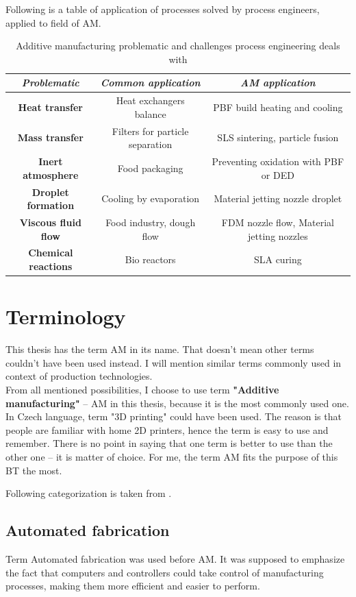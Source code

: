 \documentclass[a4paper, 11pt, reqno]{report}
\begin{document}
	Following is a table of application of processes solved by process engineers, applied to field of AM.
\\[10pt]
\begin{table}[b]
\begin{tabular}{||c||c||c|}
\hline 
\textit{Problematic} & \textit{Common application} & \textit{AM application} \\ 
\hline 
\textbf{Heat transfer} & Heat exchangers balance & PBF build heating and cooling \\
\hline
\textbf{Mass transfer} & Filters for particle separation & SLS sintering, particle fusion \\ 
\hline 
\textbf{Inert atmosphere} & Food packaging & Preventing oxidation with PBF or DED\\
\hline 
\textbf{Droplet formation} & Cooling by evaporation & Material jetting nozzle droplet \\ 
\hline 
\textbf{Viscous fluid flow} & Food industry, dough flow & FDM nozzle flow, Material jetting nozzles\\ 
\hline 
\textbf{Chemical reactions} & Bio reactors & SLA curing\\ 
\hline 
\end{tabular}
\caption{Additive manufacturing problematic and challenges process engineering deals with}
\end{table}
%
\section{Terminology}
This thesis has the term AM in its name. That doesn't mean other terms couldn't have been used instead. I will mention similar terms commonly used in context of production technologies.\\
From all mentioned possibilities, I choose to use term \textbf{"Additive manufacturing"} – AM in this thesis, because it is the most commonly used one. In Czech language, term "3D printing" could have been used. The reason is that people are familiar with home 2D printers, hence the term is easy to use and remember. There is no point in saying that one term is better to use than the other one – it is matter of choice. For me, the term AM fits the purpose of this BT the most.

	Following categorization is taken from \cite[p. 7]{AMT}.

\subsection{Automated fabrication}
Term Automated fabrication was used before AM. It was supposed to emphasize the fact that computers and controllers could take control of manufacturing processes, making them more efficient and easier to perform.
\end{document}
